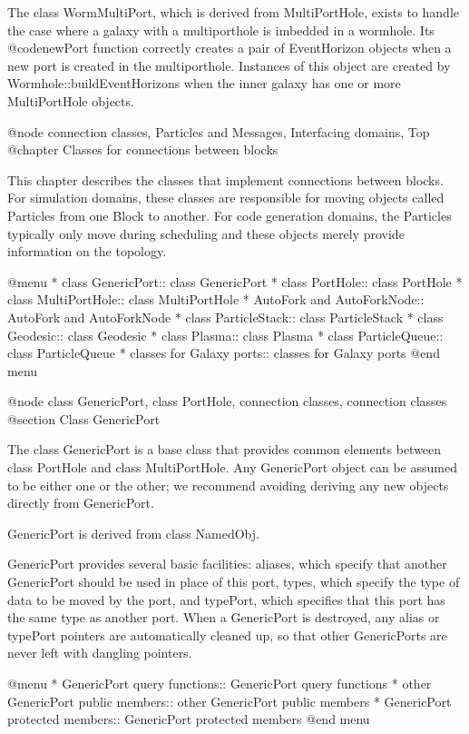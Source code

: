 The class WormMultiPort, which is derived from MultiPortHole, exists to
handle the case where a galaxy with a multiporthole is imbedded in a
wormhole.  Its @code{newPort} function correctly creates a pair of
EventHorizon objects when a new port is created in the multiporthole.
Instances of this object are created by Wormhole::buildEventHorizons
when the inner galaxy has one or more MultiPortHole objects.

@node connection classes, Particles and Messages, Interfacing domains, Top
@chapter Classes for connections between blocks

This chapter describes the classes that implement connections between
blocks.  For simulation domains, these classes are responsible for
moving objects called Particles from one Block to another.  For code
generation domains, the Particles typically only move during scheduling
and these objects merely provide information on the topology.

@menu
* class GenericPort::           class GenericPort
* class PortHole::              class PortHole
* class MultiPortHole::         class MultiPortHole
* AutoFork and AutoForkNode::   AutoFork and AutoForkNode
* class ParticleStack::         class ParticleStack
* class Geodesic::              class Geodesic
* class Plasma::                class Plasma
* class ParticleQueue::         class ParticleQueue
* classes for Galaxy ports::    classes for Galaxy ports
@end menu

@node class GenericPort, class PortHole, connection classes, connection classes
@section Class GenericPort

The class GenericPort is a base class that provides common elements
between class PortHole and class MultiPortHole.  Any GenericPort object
can be assumed to be either one or the other; we recommend avoiding
deriving any new objects directly from GenericPort.

GenericPort is derived from class NamedObj.

GenericPort provides several basic facilities: aliases, which specify
that another GenericPort should be used in place of this port, types,
which specify the type of data to be moved by the port, and typePort,
which specifies that this port has the same type as another port.
When a GenericPort is destroyed, any alias or typePort pointers are
automatically cleaned up, so that other GenericPorts are never left
with dangling pointers.

@menu
* GenericPort query functions::  GenericPort query functions
* other GenericPort public members::  other GenericPort public members
* GenericPort protected members::  GenericPort protected members
@end menu

